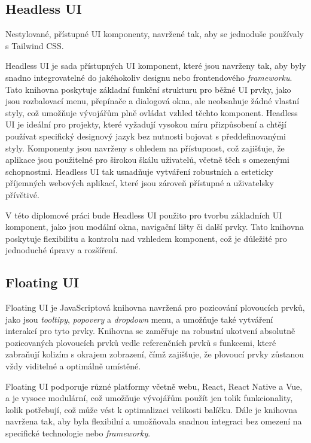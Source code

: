 \subsection{Headless UI}
Nestylované, přístupné UI komponenty, navržené tak, aby se jednoduše používaly s Tailwind CSS. \cite{HeadlessUI}

Headless UI je sada přístupných UI komponent, které jsou navrženy tak, aby byly snadno integrovatelné do jakéhokoliv designu nebo frontendového \emph{frameworku}. Tato knihovna poskytuje základní funkční strukturu pro běžné UI prvky, jako jsou rozbalovací menu, přepínače a dialogová okna, ale neobsahuje žádné vlastní styly, což umožňuje vývojářům plně ovládat vzhled těchto komponent. Headless UI je ideální pro projekty, které vyžadují vysokou míru přizpůsobení a chtějí používat specifický designový jazyk bez nutnosti bojovat s předdefinovanými styly. Komponenty jsou navrženy s ohledem na přístupnost, což zajišťuje, že aplikace jsou použitelné pro širokou škálu uživatelů, včetně těch s omezenými schopnostmi. Headless UI tak usnadňuje vytváření robustních a esteticky příjemných webových aplikací, které jsou zároveň přístupné a uživatelsky přívětivé.

V této diplomové práci bude Headless UI použito pro tvorbu základních UI komponent, jako jsou modální okna, navigační lišty či další prvky. Tato knihovna poskytuje flexibilitu a kontrolu nad vzhledem komponent, což je důležité pro jednoduché úpravy a rozšíření.

\subsection{Floating UI}
Floating UI je JavaScriptová knihovna navržená pro pozicování plovoucích prvků, jako jsou \emph{tooltipy}, \emph{popovery} a \emph{dropdown} menu, a umožňuje také vytváření interakcí pro tyto prvky. Knihovna se zaměřuje na robustní ukotvení absolutně pozicovaných plovoucích prvků vedle referenčních prvků s funkcemi, které zabraňují kolizím s okrajem zobrazení, čímž zajišťuje, že plovoucí prvky zůstanou vždy viditelné a optimálně umístěné.

Floating UI podporuje různé platformy včetně webu, React, React Native a Vue, a je vysoce modulární, což umožňuje vývojářům použít jen tolik funkcionality, kolik potřebují, což může vést k optimalizaci velikosti balíčku. Dále je knihovna navržena tak, aby byla flexibilní a umožňovala snadnou integraci bez omezení na specifické technologie nebo \emph{frameworky}. \cite{FloatingUI}

